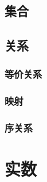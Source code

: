\documentclass{ctexbook}
\theoremstyle{definition}
\theoremstyle{remark}
\begin{document}
\section{集合}

\section{关系}

\subsection{等价关系}

\subsection{映射}

\subsection{序关系}

\chapter{实数}
\end{document}
